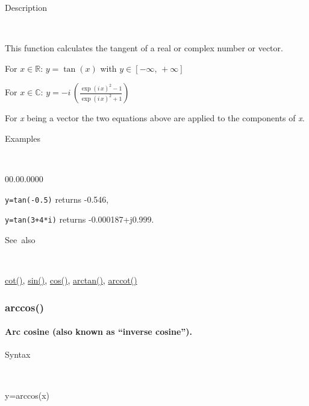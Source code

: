 \begin{description}
\item [Description]~
\end{description}
This function calculates the tangent of a real or complex number or
vector.

\medskip{}
For $x\in\mathbb{R}$: $y=\tan\left(x\right)$ with $y\in\left[-\infty,\,+\infty\right]$

\medskip{}
For $x\in\mathbb{C}$: $y=-i\,{\displaystyle \left(\frac{\exp\left(i\, x\right)^{2}-1}{\exp\left(i\, x\right)^{2}+1}\right)}$
\medskip{}

\noindent For \textit{x} being a vector the two equations above are
applied to the components of \textit{x}.

\begin{description}
\item [Examples]~
\end{description}
\begin{lyxlist}{00.00.0000}
\item [\texttt{y=tan(-0.5)}]returns -0.546,
\item [\texttt{y=tan(3+4{*}i)}]returns -0.000187+j0.999.
\end{lyxlist}
\begin{description}
\item [See~also]~
\end{description}
\textcolor{blue}{\hyperlink{cot}{cot()}}\textcolor{black}{,} \textcolor{blue}{\hyperlink{sin}{sin()}}\textcolor{black}{,}
\textcolor{blue}{\hyperlink{cos}{cos()}}\textcolor{black}{,} \textcolor{blue}{\hyperlink{arctan}{arctan()}}\textcolor{black}{,}
\textcolor{blue}{\hyperlink{arccot}{arccot()}}


\newpage
{}


\subsubsection*{\hypertarget{arccos}{}{\Large arccos()}}


\paragraph{\label{par:Arc-cosine}Arc cosine (also known as {}``inverse cosine'').}

\begin{description}
\item [Syntax]~
\end{description}
y=arccos(x)


